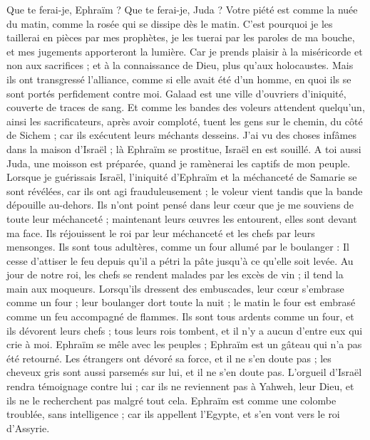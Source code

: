 \begin{multicols}{2}
Que te ferai-je, Ephraïm ? Que te ferai-je, Juda ? Votre piété est comme la nuée du matin, comme la rosée qui se dissipe dès le matin.
C'est pourquoi je les taillerai en pièces par mes prophètes, je les tuerai par les paroles de ma bouche, et mes jugements apporteront la lumière.
Car je prends plaisir à la miséricorde et non aux sacrifices ; et à la connaissance de Dieu, plus qu'aux holocaustes.
Mais ils ont transgressé l'alliance, comme si elle avait été d'un homme, en quoi ils se sont portés perfidement contre moi.
Galaad est une ville d'ouvriers d'iniquité, couverte de traces de sang.
Et comme les bandes des voleurs attendent quelqu'un, ainsi les sacrificateurs, après avoir comploté, tuent les gens sur le chemin, du côté de Sichem ; car ils exécutent leurs méchants desseins.
J'ai vu des choses infâmes dans la maison d'Israël ; là Ephraïm se prostitue, Israël en est souillé.
A toi aussi Juda, une moisson est préparée, quand je ramènerai les captifs de mon peuple.
\VerseOne{}Lorsque je guérissais Israël, l'iniquité d'Ephraïm et la méchanceté de Samarie se sont révélées, car ils ont agi frauduleusement ; le voleur vient tandis que la bande dépouille au-dehors.
Ils n'ont point pensé dans leur cœur que je me souviens de toute leur méchanceté ; maintenant leurs œuvres les entourent, elles sont devant ma face.
Ils réjouissent le roi par leur méchanceté et les chefs par leurs mensonges.
Ils sont tous adultères, comme un four allumé par le boulanger : Il cesse d'attiser le feu depuis qu'il a pétri la pâte jusqu'à ce qu'elle soit levée.
Au jour de notre roi, les chefs se rendent malades par les excès de vin ; il tend la main aux moqueurs.
Lorsqu'ils dressent des embuscades, leur cœur s'embrase comme un four ; leur boulanger dort toute la nuit ; le matin le four est embrasé comme un feu accompagné de flammes.
Ils sont tous ardents comme un four, et ils dévorent leurs chefs ; tous leurs rois tombent, et il n'y a aucun d'entre eux qui crie à moi.
Ephraïm se mêle avec les peuples ; Ephraïm est un gâteau qui n'a pas été retourné.
Les étrangers ont dévoré sa force, et il ne s'en doute pas ; les cheveux gris sont aussi parsemés sur lui, et il ne s'en doute pas.
L'orgueil d'Israël rendra témoignage contre lui ; car ils ne reviennent pas à Yahweh, leur Dieu, et ils ne le recherchent pas malgré tout cela. 
Ephraïm est comme une colombe troublée, sans intelligence ; car ils appellent l'Egypte, et s'en vont vers le roi d'Assyrie.

\end{multicols}
